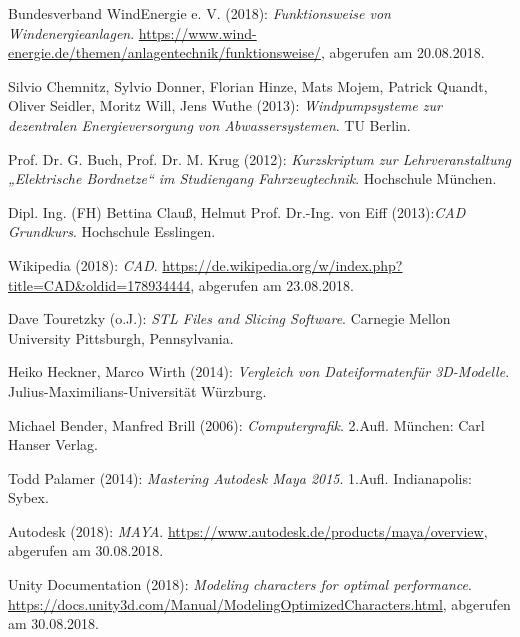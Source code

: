 
\begin{thebibliography}{999}
\label{WindEnergie}
Bundesverband WindEnergie e. V.  (2018): \textit{Funktionsweise von Windenergieanlagen}.\newline
\url{https://www.wind-energie.de/themen/anlagentechnik/funktionsweise/},\newline 
abgerufen am 20.08.2018.

\label{Windpumpsysteme}
Silvio Chemnitz, Sylvio Donner, Florian Hinze, Mats Mojem, Patrick Quandt, Oliver Seidler, Moritz Will, Jens Wuthe (2013): \textit{Windpumpsysteme zur dezentralen Energieversorgung von Abwassersystemen}. TU Berlin.

\label{Bordnetze}
Prof. Dr. G. Buch, Prof. Dr. M. Krug (2012): \textit{Kurzskriptum zur Lehrveranstaltung „Elektrische Bordnetze“ im Studiengang Fahrzeugtechnik}. Hochschule München.

\label{CAD}
Dipl. Ing. (FH) Bettina Clauß, Helmut Prof. Dr.-Ing. von Eiff (2013):\textit{CAD Grundkurs}. Hochschule Esslingen.

\label{WikiCAD}
Wikipedia  (2018): \textit{CAD}.\newline
\url{https://de.wikipedia.org/w/index.php?title=CAD&oldid=178934444},\newline 
abgerufen am 23.08.2018.

\label{Mellon}
Dave Touretzky (o.J.): \textit{STL Files and Slicing Software}. Carnegie Mellon University Pittsburgh, Pennsylvania.

\label{Würzburg}
Heiko Heckner, Marco Wirth (2014): \textit{Vergleich von Dateiformatenfür 3D-Modelle}. Julius-Maximilians-Universität Würzburg.

\label{Computergrafik}
Michael Bender, Manfred Brill (2006): \textit{Computergrafik}. 2.Aufl. München: Carl Hanser Verlag.

\label{Sybex}
Todd Palamer (2014): \textit{Mastering Autodesk Maya 2015}. 1.Aufl. Indianapolis: Sybex.

\label{Maya}
Autodesk  (2018): \textit{MAYA}.\newline
\url{https://www.autodesk.de/products/maya/overview},\newline 
abgerufen am 30.08.2018.

\label{UnityDocu}
Unity Documentation  (2018): \textit{Modeling characters for optimal performance}.\newline
\url{https://docs.unity3d.com/Manual/ModelingOptimizedCharacters.html},\newline 
abgerufen am 30.08.2018.


\end{thebibliography}
